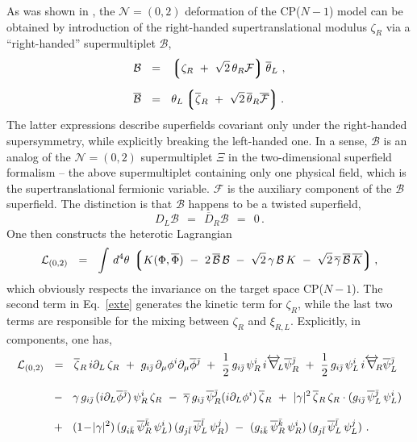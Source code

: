 \documentclass[12pt]{article}
\def\beq{\begin{equation}}
\def\eeq{\end{equation}}
\newcommand{\ntwoo}{${\mathcal N}= \left(0,2\right) $ }
\newcommand{\p}{\partial}
\newcommand{\ov}{\overline}
\newcommand{\mc}[1]{\mathcal{#1}}
\newcommand{\lgr}{\left\lgroup}
\newcommand{\rgr}{\right\rgroup}
\newcommand{\bzr}{\ov{\zeta}{}_R}
\newcommand{\zr}{\zeta_R}
\newcommand{\bj}{{\bar \jmath}}
\newcommand{\bk}{{\bar k}}
\newcommand{\bl}{{\bar l}}
\begin{document}
	As was shown in \cite{SYhet},  the \ntwoo deformation of the CP($N-1$) model can be obtained by
	introduction of the right-handed supertranslational modulus $ \zeta_R $ via a ``right-handed'' 
	supermultiplet $ \mc{B} $,
\begin{align*}
%
	\mc{B} & ~~=~~ \lgr \zr ~+~ \sqrt{2}\,\theta_R\mc{F} \rgr \ov{\theta}{}_L~, \\[2mm]
%
	\ov{\mc{B}} & ~~=~~ \theta_L \lgr \bzr ~+~ \sqrt{2}\, \ov{\theta}{}_R \ov{\mc{F}} \rgr.
\end{align*}
	The latter expressions describe superfields covariant only under the right-handed supersymmetry, 
	while explicitly breaking the left-handed one.
	In a sense, $ \mc{B} $ is an analog of the \ntwoo supermultiplet $\Xi$ in the two-dimensional 
	superfield formalism \cite{Edalati} --
	the above supermultiplet containing only one physical field, which is the supertranslational
	fermionic variable. ${\mathcal F}$ is the auxiliary component of the $\mc{B}$ superfield.
	The distinction is that $ \mc{B} $ happens to be a twisted superfield,
\[
	D_L \mc{B} ~~=~~ \ov{D}_R\mc{B} ~~=~~ 0\,.
\]
One then constructs the heterotic Lagrangian
\beq
\label{exte}
	\mc{L}_{(0,2)} ~~=~~ \int\, d^4\theta\, \lgr K(\Phi,\ov{\Phi}) 
		~-~ 2\, \ov{\mc{B}}\,\mc{B}  
		~-~  \sqrt{2}\, \gamma\,\mc{B}\,K  ~-~ \sqrt{2}\, \ov{\gamma}\,\ov{\mc{B}}\,\ov{K} \rgr,
\eeq
	which obviously respects the invariance on the target space CP($N-1$).
	The second term in Eq.~\eqref{exte} generates the kinetic term for $ \zr $, while the last two terms 
	are responsible for the mixing between $ \zr $ and $ \xi_{R,L} $.
	Explicitly, in components, one has,
\begin{align}
%
\notag
	\mc{L}_{(0,2)} & ~~=~~  \bzr\, i\p_L\, \zr 
			~+~ g_{i\bj}\,\p_\mu \phi^i \p_\mu\ov{\phi}{}^\bj
			~+~ \frac{1}{2}\, g_{i\bj}\, \psi^i_R\, i\overleftrightarrow{\nabla}{}_{\!\!L} \ov{\psi}{}^\bj_R 
			~+~ \frac{1}{2}\, g_{i\bj}\, \psi^i_L\, i\overleftrightarrow{\nabla}{}_{\!\!R} \ov{\psi}{}^\bj_L 
	\\[3mm]
%
\label{cpn-1g}
			& 
			~~-~~ \gamma\, g_{i\bj}\, (i \p_L \ov{\phi}{}^\bj)\, \psi_R^i\, \zr
			~-~ \ov{\gamma}\, g_{i\bj}\, \ov{\psi}{}_R^\bj (i \p_L \phi^i)\, \bzr
			~+~ |\gamma|^2\, \bzr\,\zr \cdot ( g_{i\bj}\, \ov{\psi}{}_L^\bj\, \psi_L^i )
	\\[3mm]
%
\notag
			& 
			~~+~~ (1 \!-\! |\gamma|^2)\, (g_{i\bk}\, \ov{\psi}{}_R^\bk\, \psi_L^i)\,
						     (g_{j\bl}\, \ov{\psi}{}_L^\bl\, \psi_R^j)
			~-~ (g_{i\bk}\, \ov{\psi}{}_R^\bk\, \psi_R^i)\, (g_{j\bl}\, \ov{\psi}{}_L^\bl\, \psi_L^j)~.
\end{align}
	
\end{document}

